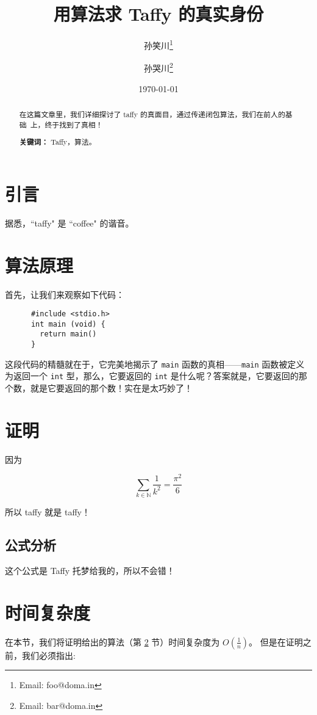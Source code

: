 \documentclass{ctexart}
\title{用算法求 Taffy 的真实身份}
\author{孙笑川\thanks{Email: foo@doma.in} \and 孙哭川\thanks{Email: bar@doma.in}}
\date{\today}
\begin{document}
  
  \maketitle
  \begin{abstract}
    {在这篇文章里，我们详细探讨了 taffy 的真面目，通过传递闭包算法，我们在前人的基础~\cite{coffee}上，终于找到了真相！}
    \par\textbf{关键词：} Taffy，算法。  
  \end{abstract}


  \tableofcontents

  \section{引言}
    据悉，``taffy" 是 ``coffee" 的谐音。  %


  \section{算法原理}\label{code}  %
    首先，让我们来观察如下代码：

    \begin{verbatim}
      #include <stdio.h>
      int main (void) {
        return main()
      }
    \end{verbatim}
    这段代码的精髓就在于，它完美地揭示了 \verb|main| 函数的真相——\verb|main| 函数被定义为返回一个 \verb|int| 型，那么，它要返回的 \verb|int| 是什么呢？答案就是，它要返回的那个数，就是它要返回的那个数！实在是太巧妙了！


  \section{证明}
    因为 

    \[
      \sum_{k \in \mathbb{N}} \frac{1}{k^2} = \frac{\pi ^2}{6}
    \]
   
    所以 taffy 就是 taffy！
    \subsection{公式分析}  %
      这个公式是 Taffy 托梦给我的，所以不会错！


  \section{时间复杂度}
    在本节，我们将证明给出的算法（第 \ref{code} 节）时间复杂度为 \( O(\frac{1}{n}) \)。  %
    但是在证明之前，我们必须指出:
\end{document}
